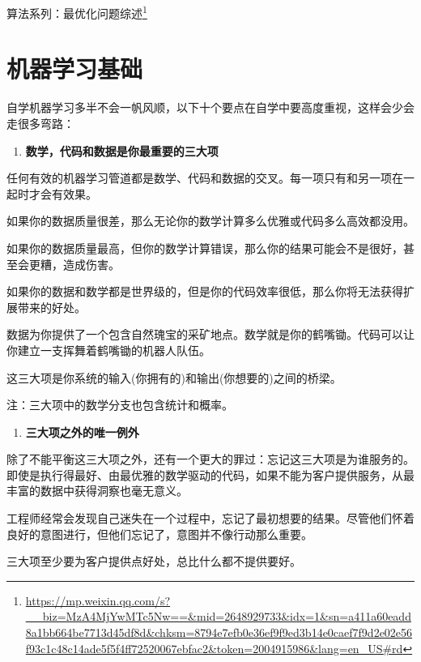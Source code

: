 \documentclass[]{ctexbook}
\providecommand{\tightlist}{%
  \setlength{\itemsep}{0pt}\setlength{\parskip}{0pt}}
\renewcommand{\href}[2]{#2\footnote{\url{#1}}}
\begin{document}
\href{https://mp.weixin.qq.com/s?__biz=MzA4MjYwMTc5Nw==\&mid=2648929733\&idx=1\&sn=a411a60eadd8a1bb664be7713d45df8d\&chksm=8794e7efb0e36ef9f9ed3b14e0caef7f9d2e02e56f93c1c48c14ade5f5f4ff72520067ebfac2\&token=2004915986\&lang=en_US\#rd}{算法系列：最优化问题综述}

\hypertarget{ux673aux5668ux5b66ux4e60ux57faux7840}{%
\chapter{机器学习基础}\label{ux673aux5668ux5b66ux4e60ux57faux7840}}

自学机器学习多半不会一帆风顺，以下十个要点在自学中要高度重视，这样会少会走很多弯路：

\begin{enumerate}
\def\labelenumi{\arabic{enumi}.}
\tightlist
\item
  \textbf{数学，代码和数据是你最重要的三大项}
\end{enumerate}

任何有效的机器学习管道都是数学、代码和数据的交叉。每一项只有和另一项在一起时才会有效果。

如果你的数据质量很差，那么无论你的数学计算多么优雅或代码多么高效都没用。

如果你的数据质量最高，但你的数学计算错误，那么你的结果可能会不是很好，甚至会更糟，造成伤害。

如果你的数据和数学都是世界级的，但是你的代码效率很低，那么你将无法获得扩展带来的好处。

数据为你提供了一个包含自然瑰宝的采矿地点。数学就是你的鹤嘴锄。代码可以让你建立一支挥舞着鹤嘴锄的机器人队伍。

这三大项是你系统的输入(你拥有的)和输出(你想要的)之间的桥梁。

注：三大项中的数学分支也包含统计和概率。

\begin{enumerate}
\def\labelenumi{\arabic{enumi}.}
\setcounter{enumi}{1}
\tightlist
\item
  \textbf{三大项之外的唯一例外}
\end{enumerate}

除了不能平衡这三大项之外，还有一个更大的罪过：忘记这三大项是为谁服务的。即使是执行得最好、由最优雅的数学驱动的代码，如果不能为客户提供服务，从最丰富的数据中获得洞察也毫无意义。

工程师经常会发现自己迷失在一个过程中，忘记了最初想要的结果。尽管他们怀着良好的意图进行，但他们忘记了，意图并不像行动那么重要。

三大项至少要为客户提供点好处，总比什么都不提供要好。
\end{document}
